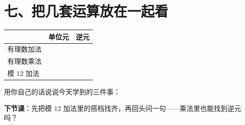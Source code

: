 \section*{七、把几套运算放在一起看}

\begin{example}[把这张表补完整]
  \begin{center}
  \begin{tabular}{@{}lcc@{}}
    \toprule
     & \textbf{单位元} & \textbf{逆元} \\
    \midrule
    有理数加法 & \hspace{1.8em} & \hspace{3.6em} \\
    有理数乘法 & \hspace{1.8em} & \hspace{3.6em} \\
    模 \(12\) 加法 & \hspace{1.8em} & \hspace{3.6em} \\
    \bottomrule
  \end{tabular}
  \end{center}
\end{example}

\begin{xiaojie}
  用你自己的话说说今天学到的三件事：
\end{xiaojie}

\noindent\textbf{下节课}：先把模 \(12\) 加法里的搭档找齐，再回头问一句——乘法里也能找到逆元吗？